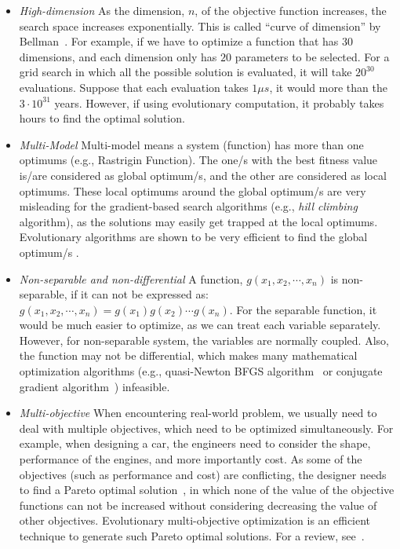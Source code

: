 \begin{itemize}

\item \textit{High-dimension} As the dimension, $n$, of the objective function increases, the search space increases exponentially. This is called ``curve of dimension'' by Bellman~\cite{Bellman1957}. For example, if we have to optimize a function that has $30$ dimensions, and each dimension only has $20$ parameters to be selected. For a grid search in which all the possible solution is evaluated, it will take $20^{30}$ evaluations. Suppose that each evaluation takes $1\mu s$, it would more than the $3\cdot 10^{31}$ years. However, if using evolutionary computation, it probably takes hours to find the optimal solution. 

\item \textit{Multi-Model} Multi-model means a system (function) has more than one optimums (e.g., Rastrigin Function). The one/s with the best fitness value is/are considered as global optimum/s, and the other are considered as local optimums. These local optimums around the global optimum/s are very misleading for the gradient-based search algorithms (e.g., \textit{hill climbing} algorithm), as the solutions may easily get trapped at the local optimums. Evolutionary algorithms are shown to be very efficient to find the global optimum/s \cite{Hansen2003}. %

\item \textit{Non-separable and non-differential} A function, $g(x_1, x_2, \cdots, x_n)$ is non-separable, if it can not be expressed as: $g(x_1, x_2, \cdots, x_n) = g(x_1)g(x_2) \cdots g(x_n)$. For the separable function, it would be much easier to optimize, as we can treat each variable separately. However, for non-separable system, the variables are normally coupled. Also, the function may not be differential, which makes many mathematical optimization algorithms (e.g., quasi-Newton BFGS algorithm~\cite{Dennis1977} or conjugate gradient algorithm~\cite{Shewchuk1994}) infeasible. %

\item \textit{Multi-objective} When encountering real-world problem, we usually need to deal with multiple objectives, which need to be optimized simultaneously. For example, when designing a car, the engineers need to consider the shape, performance of the engines, and more importantly cost. As some of the objectives (such as performance and cost) are conflicting, the designer needs to find a Pareto optimal solution~\cite{Fonseca1995}, in which none of the value of the objective functions can not be increased without considering decreasing the value of other objectives. Evolutionary multi-objective optimization is an efficient technique to generate such Pareto optimal solutions. For a review, see~\cite{Fonseca1995}. 


\end{itemize}
